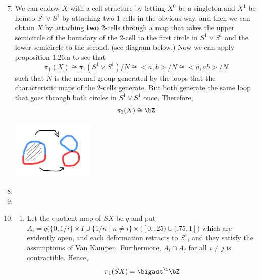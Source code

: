 \documentclass{pset}
\begin{document}
\maketitle

\pagebreak 

\begin{problem}
    \begin{enumerate}[label=1.2.\arabic*]
        \setcounter{enumi}{6}
        \item We can endow $X$ with a cell structure by letting $X^0$ be a singleton and $X^1$ be homeo $S^1 \vee S^1$ by attaching two 1-cells in the obvious way, and then we can obtain $X$ by attaching \textbf{two} 2-cells through a map that takes the upper semicircle of the boundary of the 2-cell to the first circle in $S^1 \vee S^1$ and the lower semicircle to the second. (see diagram below.) Now we can apply proposition 1.26.a to see that
        \[\pi_1(X) \cong \pi_1(S^1 \vee S^1)/N \cong <a, b>/N \cong <a, ab>/N\]
        such that $N$ is the normal group generated by the loops that the characteristic maps of the 2-cells generate. But both generate the same loop that goes through both circles in $S^1 \vee S^1$ once. Therefore,
        \[\pi_1(X) \cong \bZ\]
        
        \includegraphics[width=4cm]{cell attachment.png}
        \setcounter{enumi}{8}
        \item 

        \setcounter{enumi}{16}
        \item 
        \item \begin{enumerate}[label=(\alph*)]
            \item Let the quotient map of $SX$ be $q$ and put $A_i = q\bigl(\{0, 1/i\} \times I \cup \{1/n \mid n \neq i\} \times ([0, .25) \cup (.75, 1]\bigr)$ which are evidently open, and each deformation retracts to $S^1$, and they satisfy the assumptions of Van Kampen. Furthermore, $A_i \cap A_j$ for all $i \neq j$ is contractible. Hence,
            \[\pi_1(SX) = \bigast^\i \bZ\]
        \end{enumerate}
    \end{enumerate}
\end{problem}
\end{document}
